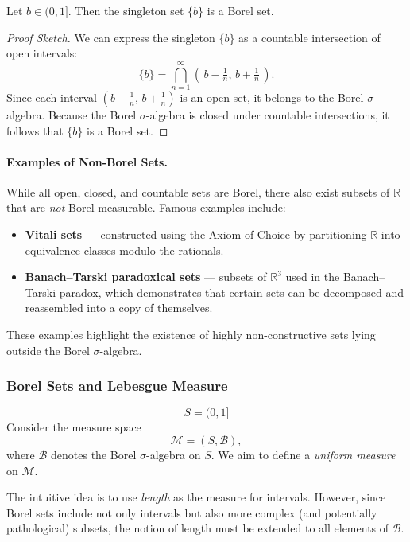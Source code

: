 \begin{proposition}
Let $b \in (0,1]$. Then the singleton set $\{b\}$ is a Borel set.
\end{proposition}

\begin{proof}[Proof Sketch]
We can express the singleton $\{b\}$ as a countable intersection of open intervals:
\[
\{b\} = \bigcap_{n=1}^{\infty} (\,b - \tfrac{1}{n},\, b + \tfrac{1}{n}\,).
\]
Since each interval $(b - \tfrac{1}{n},\, b + \tfrac{1}{n})$ is an open set, it belongs to the Borel $\sigma$-algebra.  
Because the Borel $\sigma$-algebra is closed under countable intersections, it follows that $\{b\}$ is a Borel set.
\end{proof}

\paragraph{Examples of Non-Borel Sets.}
While all open, closed, and countable sets are Borel, there also exist subsets of $\mathbb{R}$ that are \emph{not} Borel measurable.  
Famous examples include:
\begin{itemize}
    \item \textbf{Vitali sets} — constructed using the Axiom of Choice by partitioning $\mathbb{R}$ into equivalence classes modulo the rationals.
    \item \textbf{Banach–Tarski paradoxical sets} — subsets of $\mathbb{R}^3$ used in the Banach–Tarski paradox, which demonstrates that certain sets can be decomposed and reassembled into a copy of themselves.
\end{itemize}
These examples highlight the existence of highly non-constructive sets lying outside the Borel $\sigma$-algebra.


\subsubsection{Borel Sets and Lebesgue Measure}

\[
S = (0, 1]
\]
Consider the measure space 
\[
\mathcal{M} = (S, \mathcal{B}),
\]
where $\mathcal{B}$ denotes the Borel $\sigma$-algebra on $S$.  
We aim to define a \emph{uniform measure} on $\mathcal{M}$.

\vspace{0.5em}
\noindent
The intuitive idea is to use \emph{length} as the measure for intervals.  
However, since Borel sets include not only intervals but also more complex (and potentially pathological) subsets, the notion of length must be extended to all elements of $\mathcal{B}$.

